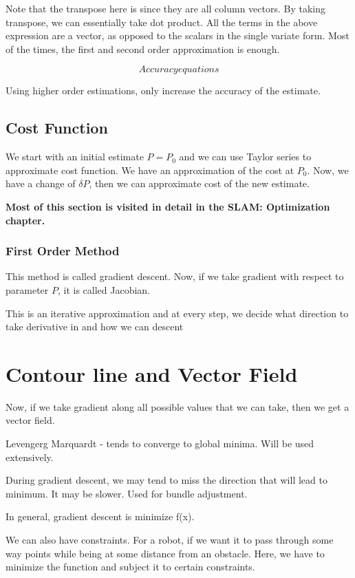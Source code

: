 Note that the transpose here is since they are all column vectors. By taking transpose, we can essentially take dot product. All the terms in the above expression are a vector, as opposed to the scalars in the single variate form. Most of the times, the first and second order approximation is enough. 

\begin{equation}
    Accuracy equations
\end{equation}

Using higher order estimations, only increase the accuracy of the estimate. 

\subsection{Cost Function}

We start with an initial estimate $P=P_0$ and we can use Taylor series to approximate cost function. We have an approximation of the cost at $P_0$. Now, we have a change of $\delta P$, then we can approximate cost of the new estimate.

\textbf{Most of this section is visited in detail in the SLAM: Optimization chapter.}

\subsubsection{First Order Method}

This method is called gradient descent. Now, if we take gradient with respect to parameter $P$, it is called Jacobian.

This is an iterative approximation and at every step, we decide what direction to take derivative in and how we can descent

\section{Contour line and Vector Field}

Now, if we take gradient along all possible values that we can take, then we get a vector field. 

Levengerg Marquardt - tends to converge to global minima. Will be used extensively.

During gradient descent, we may tend to miss the direction that will lead to minimum. It may be slower. Used for bundle adjustment.

In general, gradient descent is minimize f(x).

We can also have constraints. For a robot, if we want it to pass through some way points while being at some distance from an obstacle. Here, we have to minimize the function and subject it to certain constraints. 

